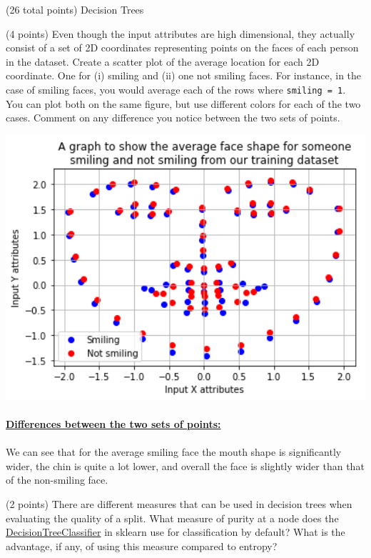 \documentclass[12pt]{article}
\begin{document}
\begin{question}{(26 total points) Decision Trees}
\begin{subquestion}
\end{subquestion}


%
%
\begin{subquestion}{(4 points) Even though the input attributes are high dimensional, they actually consist of a set of 2D coordinates representing points on the faces of each person in the dataset. 
Create a scatter plot of the average location for each 2D coordinate. One for (i) smiling and (ii) one not smiling faces. 
For instance, in the case of smiling faces, you would average each of the rows where \texttt{smiling = 1}. 
You can plot both on the same figure, but use different colors for each of the two cases. 
Comment on any difference you notice between the two sets of points. \\
}


\begin{answerbox}{36em}
\includegraphics [width=1\textwidth]{images/q3b-graph.png}\\
\\
\large{\textbf{\underline{Differences between the two sets of points:}}}\\
\\
\normalsize{
We can see that for the average smiling face the mouth shape is significantly wider, the chin is quite a lot lower, and overall the face is slightly wider than that of the non-smiling face.
}
\end{answerbox}



\end{subquestion}


%
%
\begin{subquestion}{(2 points) 
There are different measures that can be used in decision trees when evaluating the quality of a split. 
What measure of purity at a node does the \href{https://scikit-learn.org/0.19/modules/generated/sklearn.tree.DecisionTreeClassifier.html}{DecisionTreeClassifier} in sklearn use for classification by default? 
What is the advantage, if any, of using this measure compared to entropy? 
}



\end{subquestion}
\end{question}
\end{document}
